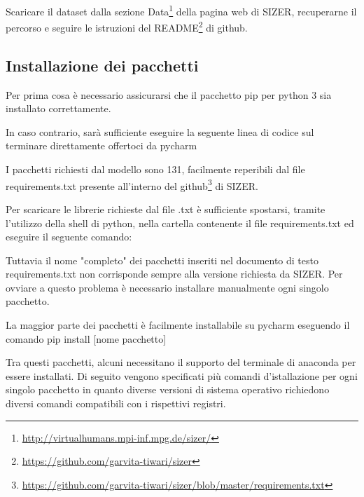 \medskip

Scaricare il dataset dalla sezione Data\footnote{\url{http://virtualhumans.mpi-inf.mpg.de/sizer/}} della pagina web di SIZER, recuperarne il percorso e seguire le istruzioni del README\footnote{\url{https://github.com/garvita-tiwari/sizer}} di github.



\medskip

\subsection{Installazione dei pacchetti}

\medskip

Per prima cosa è necessario assicurarsi che il pacchetto pip per python 3 sia installato correttamente.

\medskip

In caso contrario, sarà sufficiente eseguire la seguente linea di codice sul terminare direttamente offertoci da pycharm






I pacchetti richiesti dal modello sono 131, facilmente reperibili dal file requirements.txt presente all'interno del github\footnote{\url{https://github.com/garvita-tiwari/sizer/blob/master/requirements.txt}} di SIZER. 

\medskip

Per scaricare le librerie richieste dal file .txt è sufficiente spostarsi, tramite l'utilizzo della shell di python, nella cartella contenente il file requirements.txt ed eseguire il seguente comando:

\medskip


\medskip

Tuttavia il nome "completo" dei pacchetti inseriti nel documento di testo requirements.txt non corrisponde sempre alla versione richiesta da SIZER.
Per ovviare a questo problema è necessario installare manualmente ogni singolo pacchetto.


\medskip

La maggior parte dei pacchetti è facilmente installabile su pycharm eseguendo il comando pip install [nome pacchetto]

\medskip

Tra questi pacchetti, alcuni necessitano il supporto del terminale di anaconda per essere installati.
Di seguito vengono specificati più comandi d'istallazione per ogni singolo pacchetto in quanto diverse versioni di sistema operativo richiedono diversi comandi compatibili con i rispettivi registri.

